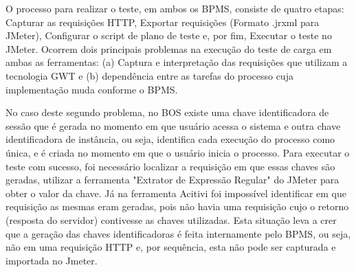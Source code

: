 \documentclass[12pt]{article}
\begin{document}
O processo para realizar o teste, em ambos os BPMS, consiste de quatro etapas: Capturar as requisições HTTP, Exportar requisições (Formato .jrxml para JMeter), Configurar o script de plano de teste e, por fim, Executar o teste no JMeter. Ocorrem dois principais problemas na execução do teste de carga em ambas as ferramentas: (a) Captura e interpretação das requisições que utilizam a tecnologia GWT e (b) dependência entre as tarefas do processo cuja implementação muda conforme o BPMS. 

No caso deste segundo problema, no BOS existe uma chave identificadora de sessão que é gerada no momento em que usuário acessa o sistema e outra chave identificadora de instância, ou seja, identifica cada execução do processo como única, e é criada no momento em que o usuário inicia o processo. Para executar o teste com sucesso, foi necessário localizar a requisição em que essas chaves são geradas, utilizar a ferramenta "Extrator de Expressão Regular" do JMeter para obter o valor da chave. Já na ferramenta Acitivi foi impossível identificar em que requisição as mesmas eram geradas, pois não havia uma requisição cujo o retorno (resposta do servidor) contivesse as chaves utilizadas. Esta situação leva a crer que a geração das chaves identificadoras é feita internamente pelo BPMS, ou seja, não em uma requisição HTTP e, por sequência, esta não pode ser capturada e importada no Jmeter.


\end{document}
